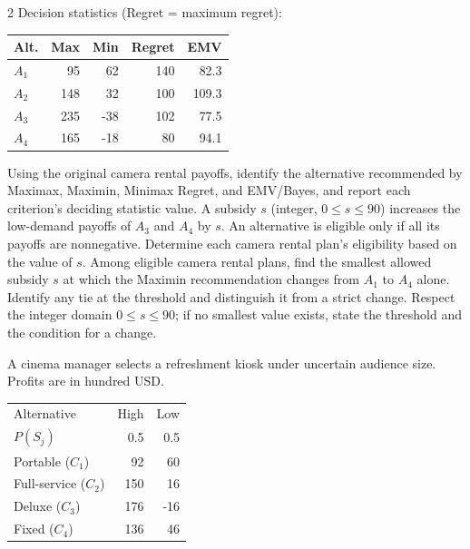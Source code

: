 \begin{multicols}{2}
Decision statistics (Regret = maximum regret):

\vspace{-4mm}
\begin{center}\small\setlength{\tabcolsep}{4pt}
	\begin{tabular}{lrrrr}\toprule
		Alt. & Max & Min & Regret & EMV\\ \midrule
				$A_1$ & 95 & 62 & 140 & 82.3\\
		$A_2$ & 148 & 32 & 100 & 109.3\\
		$A_3$ & 235 & -38 & 102 & 77.5\\
		$A_4$ & 165 & -18 & 80 & 94.1\\
		\bottomrule
	\end{tabular}
\end{center}
\vspace{-4mm}

\noindent Using the original camera rental payoffs, identify the alternative recommended by Maximax, Maximin, Minimax Regret, and EMV/Bayes, and report each criterion's deciding statistic value.  A subsidy $s$ (integer, $0\leq s\leq90$) increases the low-demand payoffs of $A_3$ and $A_4$ by $s$. An alternative is eligible only if all its payoffs are nonnegative. Determine each camera rental plan's eligibility based on the value of $s$.  Among eligible camera rental plans, find the smallest allowed subsidy $s$ at which the Maximin recommendation changes from $A_1$ to $A_4$ alone. Identify any tie at the threshold and distinguish it from a strict change. Respect the integer domain $0\leq s\leq90$; if no smallest value exists, state the threshold and the condition for a change. 


A cinema manager selects a refreshment kiosk under uncertain audience size. Profits are in hundred USD. \vspace{-3mm}

\begin{center}\small\setlength{\tabcolsep}{4pt}
	\begin{tabular}{lrr}\toprule
		Alternative & High & Low\\
		$P(S_j)$ & 0.5 & 0.5\\ \midrule
				Portable ($C_1$) & 92 & 60\\
		Full-service ($C_2$) & 150 & 16\\
		Deluxe ($C_3$) & 176 & -16\\
		Fixed ($C_4$) & 136 & 46\\
		\bottomrule
	\end{tabular}
\end{center} \vspace{-4mm}


\end{multicols}
